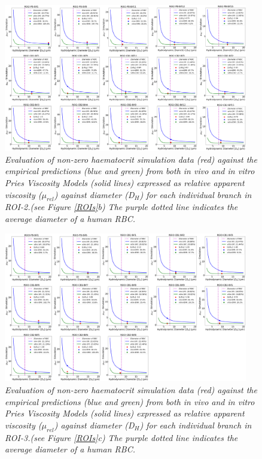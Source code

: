 \uselandscape
\begin{figure}[H]
\centering
\includegraphics[width=0.95\textwidth]{images/DeviationsViscosity-ROI2.png}
\caption{\textit{Evaluation of non-zero haematocrit simulation data (red) against the empirical predictions (blue and green) from both in vivo and in vitro Pries Viscosity Models (solid lines) expressed as relative apparent viscosity ($\mu_{rel}$) against diameter (D$_{H}$) for each individual branch in ROI-2.(see Figure \ref{ROIs}b) The purple dotted line indicates the average diameter of a human RBC.} \label{DeviationsViscosity-ROI2}}
\end{figure}

\begin{figure}[H]
\centering
\includegraphics[width=0.95\textwidth]{images/DeviationsViscosity-ROI3.png}
\caption{\textit{Evaluation of non-zero haematocrit simulation data (red) against the empirical predictions (blue and green) from both in vivo and in vitro Pries Viscosity Models (solid lines) expressed as relative apparent viscosity ($\mu_{rel}$) against diameter (D$_{H}$) for each individual branch in ROI-3.(see Figure \ref{ROIs}c) The purple dotted line indicates the average diameter of a human RBC.} \label{DeviationsViscosity-ROI3}}
\end{figure}


\useportrait